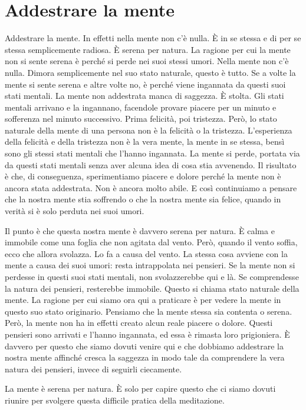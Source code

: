 \chapter{Addestrare la mente}

Addestrare la mente. In effetti nella mente non c'è nulla. È in se
stessa e di per se stessa semplicemente radiosa. È serena per natura. La
ragione per cui la mente non si sente serena è perché si perde nei suoi
stessi umori. Nella mente non c'è nulla. Dimora semplicemente nel suo
stato naturale, questo è tutto. Se a volte la mente si sente serena e
altre volte no, è perché viene ingannata da questi suoi stati mentali.
La mente non addestrata manca di saggezza. È stolta. Gli stati mentali
arrivano e la ingannano, facendole provare piacere per un minuto e
sofferenza nel minuto successivo. Prima felicità, poi tristezza. Però,
lo stato naturale della mente di una persona non è la felicità o la
tristezza. L'esperienza della felicità e della tristezza non è la vera
mente, la mente in se stessa, bensì sono gli stessi stati mentali che
l'hanno ingannata. La mente si perde, portata via da questi stati
mentali senza aver alcuna idea di cosa stia avvenendo. Il risultato è
che, di conseguenza, sperimentiamo piacere e dolore perché la mente non
è ancora stata addestrata. Non è ancora molto abile. E così continuiamo
a pensare che la nostra mente stia soffrendo o che la nostra mente sia
felice, quando in verità si è solo perduta nei suoi umori.

Il punto è che questa nostra mente è davvero serena per natura. È calma
e immobile come una foglia che non agitata dal vento. Però, quando il
vento soffia, ecco che allora svolazza. Lo fa a causa del vento. La
stessa cosa avviene con la mente a causa dei suoi umori: resta
intrappolata nei pensieri. Se la mente non si perdesse in questi suoi
stati mentali, non svolazzerebbe qui e là. Se comprendesse la natura dei
pensieri, resterebbe immobile. Questo si chiama stato naturale della
mente. La ragione per cui siamo ora qui a praticare è per vedere la
mente in questo suo stato originario. Pensiamo che la mente stessa sia
contenta o serena. Però, la mente non ha in effetti creato alcun reale
piacere o dolore. Questi pensieri sono arrivati e l'hanno ingannata, ed
essa è rimasta loro prigioniera. È davvero per questo che siamo dovuti
venire qui e che dobbiamo addestrare la nostra mente affinché cresca la
saggezza in modo tale da comprendere la vera natura dei pensieri, invece
di seguirli ciecamente.

La mente è serena per natura. È solo per capire questo che ci siamo
dovuti riunire per svolgere questa difficile pratica della meditazione.

